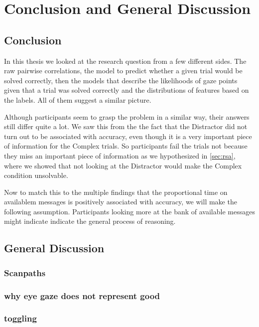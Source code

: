 ﻿\chapter{Conclusion and General Discussion}
\label{chap:conclusion}

\section{Conclusion}
\label{sec:conclusion}

In this thesis we looked at the research question from a few different sides. The raw pairwise correlations, the model to predict whether a given trial would be solved correctly, then the models that describe the likelihoods of gaze points given that a trial was solved correctly and the distributions of features based on the labels. All of them suggest a similar picture. 

Although participants seem to grasp the problem in a similar way, their answers still differ quite a lot. We saw this from the the fact that the Distractor did not turn out to be associated with accuracy, even though it is a very important piece of information for the Complex trials. So participants fail the trials not because they miss an important piece of information as we hypothesized in \autoref{sec:rsa}, where we showed that not looking at the Distractor would make the Complex condition unsolvable. 

Now to match this to the multiple findings that the proportional time on availablem messages is positively associated with accuracy, we will make the following assumption. Participants looking more at the bank of available messages might indicate indicate the general process of reasoning.

\section{General Discussion}
\label{sec:general-discussion}

\subsection{Scanpaths}

\subsection{why eye gaze does not represent good}

\subsection{toggling}

